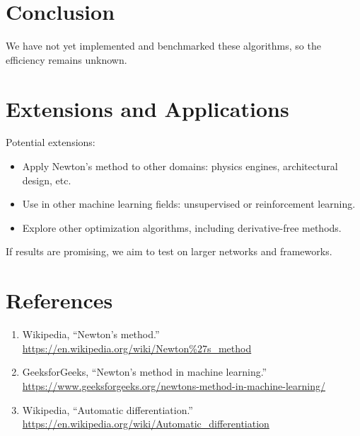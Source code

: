 \documentclass{article}
\begin{document}
\section*{Conclusion}
We have not yet implemented and benchmarked these algorithms, so the efficiency remains unknown.

\section*{Extensions and Applications}
Potential extensions:
\begin{itemize}
    \item Apply Newton’s method to other domains: physics engines, architectural design, etc.
    \item Use in other machine learning fields: unsupervised or reinforcement learning.
    \item Explore other optimization algorithms, including derivative-free methods.
\end{itemize}

If results are promising, we aim to test on larger networks and frameworks.

\section*{References}
\begin{enumerate}
    \item Wikipedia, “Newton’s method.” \url{https://en.wikipedia.org/wiki/Newton%27s_method}
    \item GeeksforGeeks, “Newton’s method in machine learning.” \url{https://www.geeksforgeeks.org/newtons-method-in-machine-learning/}
    \item Wikipedia, “Automatic differentiation.” \url{https://en.wikipedia.org/wiki/Automatic_differentiation}
\end{enumerate}
\end{document}
